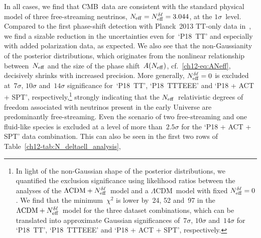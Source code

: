 In all cases, we find that CMB~data are consistent with the standard physical model of three free-streaming neutrinos, $N_\mathrm{eff} = N_\mathrm{eff}^{\delta\ell} = 3.044$, at the $1\sigma$~level. Compared to the first phase-shift detection with Planck~2013 TT-only data in~\cite{Follin:2015hya}, we find a sizable reduction in the uncertainties even for~`P18~TT' and especially with added polarization data, as expected. We also see that the non-Gaussianity of the posterior distributions, which originates from the nonlinear relationship between~$N_\mathrm{eff}$ and the size of the phase shift~$A(N_\mathrm{eff})$, cf.~\eqref{ch12-eq:ANeff}, decisively shrinks with increased precision. More generally, $N_\mathrm{eff}^{\delta\ell} = 0$ is excluded at~$7\sigma$, $10\sigma$ and~$14\sigma$ significance for~`P18~TT', `P18~TTTEEE' and `P18 + ACT + SPT', respectively,\footnote{In light of the non-Gaussian shape of the posterior distributions, we quantified the exclusion significance using likelihood ratios between the analyses of the $\Lambda\mathrm{CDM} + N_\mathrm{eff}^{\delta\ell}$~model and a $\Lambda\mathrm{CDM}$~model with fixed $N_\mathrm{eff}^{\delta\ell} = 0$. We find that the minimum~$\chi^2$ is lower by~24, 52 and~97 in the $\Lambda\mathrm{CDM} + N_\mathrm{eff}^{\delta\ell}$~model for the three dataset combinations, which can be translated into approximate Gaussian significances of~$7\sigma$, $10\sigma$ and~$14\sigma$ for `P18~TT', `P18~TTTEEE' and `P18 + ACT + SPT', respectively.\label{ch12-fn:significance}} strongly indicating that the $N_\mathrm{eff}$~relativistic degrees of freedom associated with neutrinos present in the early Universe are predominantly free-streaming. Even the scenario of two free-streaming and one fluid-like species is excluded at a level of more than~$2.5\sigma$ for the `P18 + ACT + SPT' data combination. This can also be seen in the first two rows of Table~\ref{ch12-tab:N_deltaell_analysis},%
